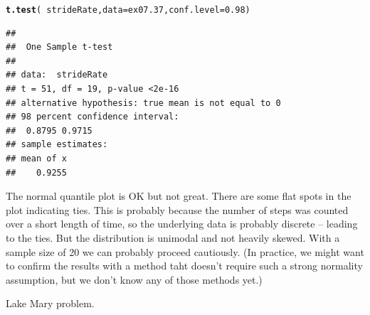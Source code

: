 \documentclass[twoside]{book}\usepackage[]{graphicx}\usepackage[]{xcolor}
\makeatletter
\newcommand{\hlnum}[1]{\textcolor[rgb]{0.686,0.059,0.569}{#1}}%
\newcommand{\hlopt}[1]{\textcolor[rgb]{0,0,0}{#1}}%
\newcommand{\hlstd}[1]{\textcolor[rgb]{0.345,0.345,0.345}{#1}}%
\newcommand{\hlkwc}[1]{\textcolor[rgb]{0.333,0.667,0.333}{#1}}%
\newcommand{\hlkwd}[1]{\textcolor[rgb]{0.737,0.353,0.396}{\textbf{#1}}}%
\newenvironment{kframe}{%
 \def\at@end@of@kframe{}%
 \ifinner\ifhmode%
  \def\at@end@of@kframe{\end{minipage}}%
  \begin{minipage}{\columnwidth}%
 \fi\fi%
 \def\FrameCommand##1{\hskip\@totalleftmargin \hskip-\fboxsep
 \colorbox{shadecolor}{##1}\hskip-\fboxsep
     \hskip-\linewidth \hskip-\@totalleftmargin \hskip\columnwidth}%
 \MakeFramed {\advance\hsize-\width
   \@totalleftmargin\z@ \linewidth\hsize
   \@setminipage}}%
 {\par\unskip\endMakeFramed%
 \at@end@of@kframe}
\newenvironment{knitrout}{}{} %
\makeatother
\begin{document}
\begin{solution}
\begin{knitrout}
\color{fgcolor}\begin{kframe}
\begin{alltt}
\hlkwd{t.test}\hlstd{(} \hlopt{~} \hlstd{strideRate,} \hlkwc{data} \hlstd{= ex07.37,} \hlkwc{conf.level} \hlstd{=} \hlnum{0.98}\hlstd{)}
\end{alltt}
\begin{verbatim}
## 
## 	One Sample t-test
## 
## data:  strideRate
## t = 51, df = 19, p-value <2e-16
## alternative hypothesis: true mean is not equal to 0
## 98 percent confidence interval:
##  0.8795 0.9715
## sample estimates:
## mean of x 
##    0.9255
\end{verbatim}
\end{kframe}
\end{knitrout}
	The normal quantile plot is OK but not great.  There are some flat spots in
	the plot indicating ties.  This is probably because the number of steps was
	counted over a short length of time, so the underlying data is probably
	discrete -- leading to the ties.  But the distribution is unimodal and 
	not heavily skewed.  With a sample size of 20 we can probably proceed 
	cautiously.  (In practice, we might want to confirm the results with a method
	taht doesn't require such a strong normality assumption, but we don't know
	any of those methods yet.)
\end{solution}

\begin{problem}
Lake Mary problem.
\end{problem}
\end{document}
